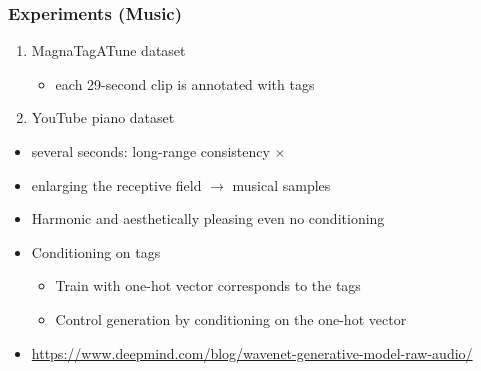 \documentclass[dvipdfmx]{beamer}
\begin{document}
\begin{frame}
    \frametitle{Experiments (Music)}
    \begin{enumerate}
        \item MagnaTagATune dataset
        \begin{itemize}
            \item each 29-second clip is annotated with tags
        \end{itemize}
        \item YouTube piano dataset
    \end{enumerate}
    \begin{itemize}
        \item several seconds: long-range consistency $\times$
        \item enlarging the receptive field $\to$ musical samples
    \end{itemize}
    \begin{itemize}
        \item Harmonic and aesthetically pleasing even no conditioning
        \item Conditioning on tags
        \begin{itemize}
            \item Train with one-hot vector corresponds to the tags
            \item Control generation by conditioning on the one-hot vector
        \end{itemize}
        \item {\footnotesize \url{https://www.deepmind.com/blog/wavenet-generative-model-raw-audio/}}
    \end{itemize}
\end{frame}
\end{document}

